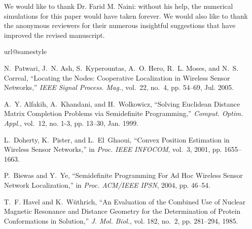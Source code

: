 \documentclass[10pt,double]{IEEEtran}
\begin{document}
We would like to thank Dr. Farid M. Naini: without his help, the numerical
simulations for this paper would have taken forever. We would also like to
thank the anonymous reviewers for their numerous insightful suggestions that
have improved the revised manuscript.

\begin{thebibliography}{10}
\providecommand{\url}[1]{#1}
\csname url@samestyle\endcsname
\providecommand{\newblock}{\relax}
\providecommand{\bibinfo}[2]{#2}
\providecommand{\BIBentrySTDinterwordspacing}{\spaceskip=0pt\relax}
\providecommand{\BIBentryALTinterwordstretchfactor}{4}
\providecommand{\BIBentryALTinterwordspacing}{\spaceskip=\fontdimen2\font plus
\BIBentryALTinterwordstretchfactor\fontdimen3\font minus
  \fontdimen4\font\relax}
\providecommand{\BIBforeignlanguage}[2]{{\expandafter\ifx\csname l@#1\endcsname\relax
\typeout{** WARNING: IEEEtran.bst: No hyphenation pattern has been}\typeout{** loaded for the language `#1'. Using the pattern for}\typeout{** the default language instead.}\else
\language=\csname l@#1\endcsname
\fi
#2}}
\providecommand{\BIBdecl}{\relax}
\BIBdecl

N.~Patwari, J.~N. Ash, S.~Kyperountas, A.~O. Hero, R.~L. Moses, and N.~S.
  Correal, ``{Locating the Nodes: Cooperative Localization in Wireless Sensor
  Networks},'' \emph{IEEE Signal Process. Mag.}, vol.~22, no.~4, pp. 54--69,
  Jul. 2005.

A.~Y. Alfakih, A.~Khandani, and H.~Wolkowicz, ``Solving {E}uclidean Distance
  Matrix Completion Problems via Semidefinite Programming,''
  \emph{Comput. Optim. Appl.}, vol.~12, no. 1-3, pp.
  13--30, Jan. 1999.

L.~Doherty, K.~Pister, and L.~El~Ghaoui, ``Convex Position Estimation in
  Wireless Sensor Networks,'' in \emph{Proc. IEEE INFOCOM}, vol.~3, 2001, pp.
  1655--1663.

P.~Biswas and Y.~Ye, ``Semidefinite Programming For Ad Hoc Wireless Sensor
  Network Localization,'' in \emph{Proc. ACM/IEEE IPSN}, 2004, pp. 46--54.



T.~F. Havel and K.~W\"{u}thrich, ``An Evaluation of the Combined Use of Nuclear
  Magnetic Resonance and Distance Geometry for the Determination of Protein
  Conformations in Solution,'' \emph{J. Mol. Biol.}, vol. 182,
  no.~2, pp. 281--294, 1985.






\end{thebibliography}
\end{document}
